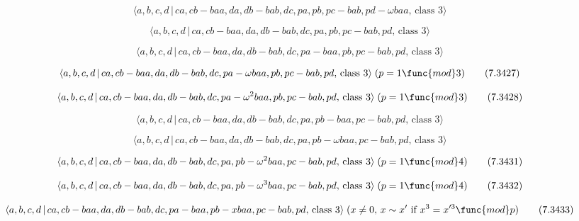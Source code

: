 \documentclass[10pt]{article}
\begin{document}
\begin{equation}
\langle a,b,c,d\,|\,ca,cb-baa,da,db-bab,dc,pa,pb,pc-bab,pd-\omega baa,\,%
\text{class }3\rangle  \tag{7.3424}
\end{equation}

\begin{equation}
\langle a,b,c,d\,|\,ca,cb-baa,da,db-bab,dc,pa,pb,pc-bab,pd,\,\text{class }%
3\rangle  \tag{7.3425}
\end{equation}

\begin{equation}
\langle a,b,c,d\,|\,ca,cb-baa,da,db-bab,dc,pa-baa,pb,pc-bab,pd,\,\text{class 
}3\rangle  \tag{7.3426}
\end{equation}

\begin{equation}
\langle a,b,c,d\,|\,ca,cb-baa,da,db-bab,dc,pa-\omega baa,pb,pc-bab,pd,\,%
\text{class }3\rangle \;(p=1\func{mod}3)  \tag{7.3427}
\end{equation}

\begin{equation}
\langle a,b,c,d\,|\,ca,cb-baa,da,db-bab,dc,pa-\omega ^{2}baa,pb,pc-bab,pd,\,%
\text{class }3\rangle \;(p=1\func{mod}3)  \tag{7.3428}
\end{equation}

\begin{equation}
\langle a,b,c,d\,|\,ca,cb-baa,da,db-bab,dc,pa,pb-baa,pc-bab,pd,\,\text{class 
}3\rangle  \tag{7.3429}
\end{equation}

\begin{equation}
\langle a,b,c,d\,|\,ca,cb-baa,da,db-bab,dc,pa,pb-\omega baa,pc-bab,pd,\,%
\text{class }3\rangle  \tag{7.3430}
\end{equation}

\begin{equation}
\langle a,b,c,d\,|\,ca,cb-baa,da,db-bab,dc,pa,pb-\omega ^{2}baa,pc-bab,pd,\,%
\text{class }3\rangle \;(p=1\func{mod}4)  \tag{7.3431}
\end{equation}

\begin{equation}
\langle a,b,c,d\,|\,ca,cb-baa,da,db-bab,dc,pa,pb-\omega ^{3}baa,pc-bab,pd,\,%
\text{class }3\rangle \;(p=1\func{mod}4)  \tag{7.3432}
\end{equation}

\begin{equation}
\langle a,b,c,d\,|\,ca,cb-baa,da,db-bab,dc,pa-baa,pb-xbaa,pc-bab,pd,\,\text{%
class }3\rangle \;(x\neq 0,\,x\sim x^{\prime }\text{ if }x^{3}=x^{\prime 3}%
\func{mod}p)  \tag{7.3433}
\end{equation}
\end{document}
